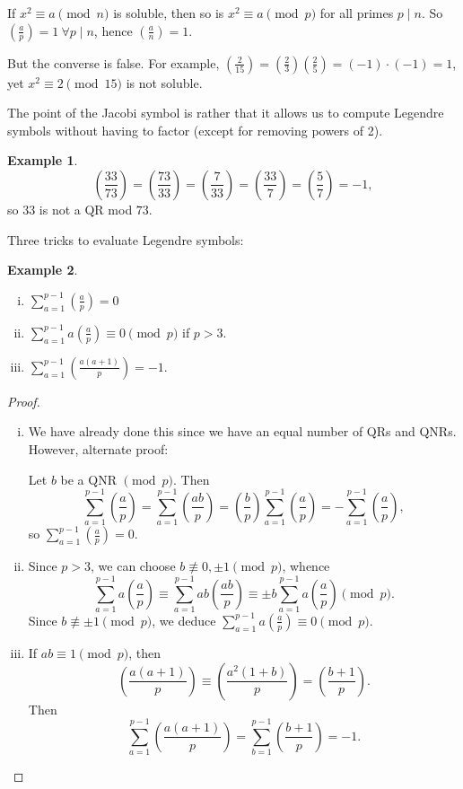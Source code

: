 \documentclass{article}
\theoremstyle{definition}
\newtheorem{example}{Example}[section]
\begin{document}
If $x^2 \equiv a\pmod{n}$ is soluble, then so is $x^2\equiv  a \pmod{p}$ for all primes $p \mid n$. So $\left(\frac{a}{p} \right) = 1 ~\forall p \mid n$, hence $\left(\frac{a}{n} \right) = 1$.

But the converse is false. For example, $\left(\frac{2}{15} \right) = \left(\frac{2}{3} \right) \left(\frac{2}{5} \right) = (-1)\cdot (-1) = 1$, yet $x^2 \equiv 2 \pmod{15}$ is not soluble.

The point of the Jacobi symbol is rather that it allows us to compute Legendre symbols without having to factor (except for removing powers of 2).
\begin{example}
    \[
    \left(\frac{33}{73} \right) = \left(\frac{73}{33} \right) = \left(\frac{7}{33} \right) = \left(\frac{33}{7} \right) = \left(\frac{5}{7} \right) = -1, 
    \]    
    so $33$ is not a QR mod $73$.
\end{example}

Three tricks to evaluate Legendre symbols:
\begin{example}
    \begin{enumerate}[(i)]
        \item $\sum_{a=1}^{p-1} \left(\frac{a}{p} \right) = 0$
        \item $\sum_{a=1}^{p-1} a \left(\frac{a}{p} \right) \equiv 0\pmod{p}$ if $p > 3$.
        \item $\sum_{a=1}^{p-1} \left(\frac{a(a+1)}{p} \right) = -1$.
    \end{enumerate}
\end{example}
\begin{proof}
    \begin{enumerate}[(i)]
        \item We have already done this since we have an equal number of QRs and QNRs. However, alternate proof:
        \vspace{1mm}
        
        Let $b$ be a QNR $\pmod{p}$. Then 
        \[
        \sum_{a=1}^{p-1} \left(\frac{a}{p} \right) = \sum_{a=1}^{p-1} \left(\frac{ab}{p} \right) = \left(\frac{b}{p} \right) \sum_{a=1}^{p-1} \left(\frac{a}{p} \right) = - \sum_{a=1}^{p-1} \left(\frac{a}{p} \right), 
        \]
        so $\sum_{a=1}^{p-1} \left(\frac{a}{p} \right) = 0$.
        \item Since $p>3$, we can choose $b \not\equiv 0, \pm 1 \pmod{p}$, whence \[
        \sum_{a=1}^{p-1} a \left(\frac{a}{p} \right) \equiv  \sum_{a=1}^{p-1} ab \left(\frac{ab}{p} \right) \equiv  \pm b \sum_{a=1}^{p-1} a \left(\frac{a}{p} \right) \pmod{p}.
        \]
        Since $b \not\equiv \pm 1 \pmod{p}$, we deduce $\sum_{a=1}^{p-1} a \left(\frac{a}{p} \right) \equiv 0 \pmod{p}$.
        \item  If $ab \equiv 1\pmod{p}$, then \[
        \left(\frac{a(a+1)}{p} \right) \equiv \left(\frac{a^2(1+b)}{p} \right) = \left(\frac{b+1}{p} \right).  
        \]
        Then \[
        \sum_{a=1}^{p-1} \left(\frac{a(a+1)}{p} \right) = \sum_{b=1}^{p-1} \left(\frac{b+1}{p} \right) = -1.
        \]
    \end{enumerate}
\end{proof}
\end{document}
